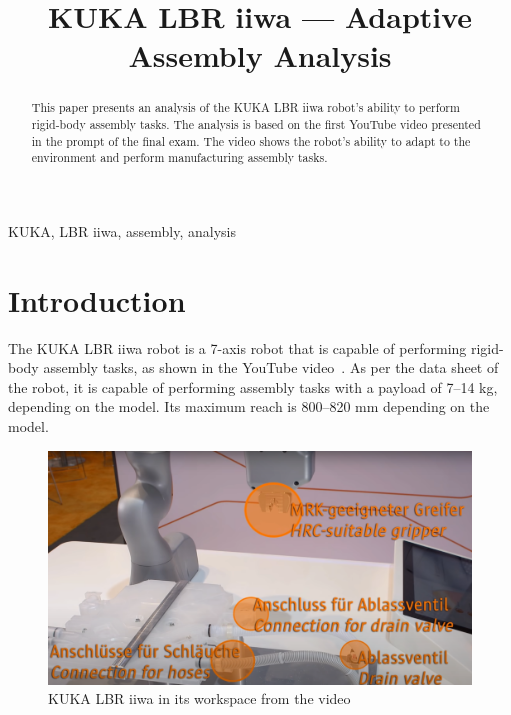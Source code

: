 \documentclass[conference]{IEEEtran}
\begin{document}
\title{KUKA LBR iiwa --- Adaptive Assembly Analysis}

\author{
}

\maketitle

\begin{abstract}
This paper presents an analysis of the KUKA LBR iiwa robot's
ability to perform rigid-body assembly tasks. The analysis is based on the first YouTube
video presented in the prompt of the final exam. The video shows the robot's ability
to adapt to the environment and perform manufacturing assembly tasks.
\end{abstract}

\begin{IEEEkeywords}
KUKA, LBR iiwa, assembly, analysis
\end{IEEEkeywords}

\section{Introduction}
The KUKA LBR iiwa robot is a 7-axis robot that is capable of performing 
rigid-body assembly tasks, as shown in the YouTube video~\cite{youtube_2014}. As per the data sheet
of the robot, it is capable of performing assembly tasks with a payload of 7--14 kg,
depending on the model.
Its maximum reach is 800--820 mm depending on the model.

\begin{figure}[h!]
\centering
\includegraphics[scale=0.15]{kuka-setup-desc.png}
\caption{KUKA LBR iiwa in its workspace from the video}
\label{kuka-setup-desc}
\end{figure}
\end{document}
